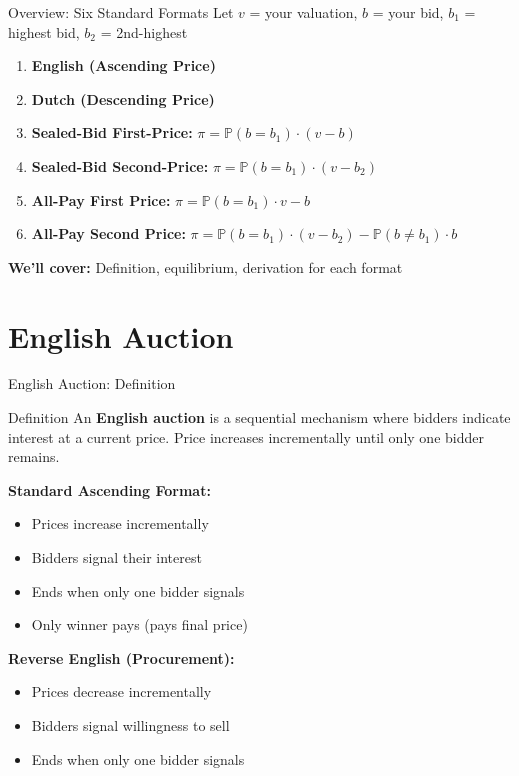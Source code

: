 \documentclass[xcolor={x11names}, aspectratio=169 ]{beamer}
\begin{document}
\begin{frame}{Overview: Six Standard Formats}
Let $v$ = your valuation, $b$ = your bid, $b_1$ = highest bid, $b_2$ = 2nd-highest

\begin{enumerate}
  \item \textbf{English (Ascending Price)}
  \item \textbf{Dutch (Descending Price)}
  \item \textbf{Sealed-Bid First-Price:} $\pi = \mathbb{P}(b = b_1) \cdot (v - b)$
  \item \textbf{Sealed-Bid Second-Price:} $\pi = \mathbb{P}(b = b_1) \cdot (v - b_2)$
  \item \textbf{All-Pay First Price:} $\pi = \mathbb{P}(b = b_1) \cdot v - b$
  \item \textbf{All-Pay Second Price:} $\pi = \mathbb{P}(b = b_1) \cdot (v - b_2) - \mathbb{P}(b \neq b_1) \cdot b$
\end{enumerate}

\textbf{We'll cover:} Definition, equilibrium, derivation for each format
\end{frame}

\section{English Auction}

\begin{frame}{English Auction: Definition}
\begin{block}{Definition}
An \textbf{English auction} is a sequential mechanism where bidders indicate interest at a current price. Price increases incrementally until only one bidder remains.
\end{block}

\textbf{Standard Ascending Format:}
\begin{itemize}
\item Prices increase incrementally
\item Bidders signal their interest
\item Ends when only one bidder signals
\item Only winner pays (pays final price)
\end{itemize}

\textbf{Reverse English (Procurement):}
\begin{itemize}
\item Prices decrease incrementally
\item Bidders signal willingness to sell
\item Ends when only one bidder signals
\end{itemize}
\end{frame}
\end{document}
